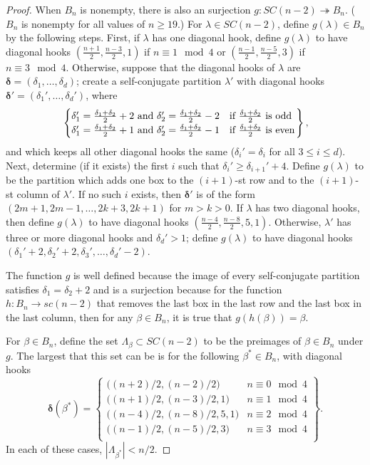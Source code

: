 \documentclass[12pt,leqno]{amsart}
\numberwithin{equation}{section}
\theoremstyle{definition}
\begin{document}
\begin{proof}
When $B_n$ is nonempty, there is also an surjection $g:SC(n-2) \twoheadrightarrow B_n$.  ($B_n$ is nonempty for all values of $n\geq 19$.)  For ${\lambda}\in SC(n-2)$, define $g({\lambda})\in B_n$ by the following steps.  First, if ${\lambda}$ has one diagonal hook, define $g({\lambda})$ to have diagonal hooks $(\frac{n+1}{2},\frac{n-3}{2},1)$ if $n\equiv 1\mod 4$ or $(\frac{n-1}{2},\frac{n-5}{2},3)$ if $n\equiv 3\mod 4$. Otherwise, suppose that the diagonal hooks of ${\lambda}$ are $\boldsymbol\delta=(\delta_1,\hdots,\delta_d)$; create a self-conjugate partition ${\lambda}'$ with diagonal hooks $\boldsymbol\delta'=(\delta_1',\hdots,\delta_d')$, where
\begin{equation*}
\left.
\begin{cases}
\delta_1'=\frac{\delta_1+\delta_2}{2}+2 \textup{ and } \delta_2'=\frac{\delta_1+\delta_2}{2}-2 & \textup{if $\frac{\delta_1+\delta_2}{2}$ is odd} \\
\delta_1'=\frac{\delta_1+\delta_2}{2}+1 \textup{ and } \delta_2'=\frac{\delta_1+\delta_2}{2}-1 & \textup{if $\frac{\delta_1+\delta_2}{2}$ is even}
\end{cases}
\right\},
\end{equation*}
and which keeps all other diagonal hooks the same ($\delta_i'=\delta_i$ for all $3\leq i\leq d$).  Next, determine (if it exists) the first $i$ such that $\delta_i'\geq \delta_{i+1}'+4$.  Define $g({\lambda})$ to be the partition which adds one box to the $(i+1)$-st row and to the $(i+1)$-st column of ${\lambda}'$.  If no such $i$ exists, then $\boldsymbol\delta'$ is of the form $(2m+1,2m-1,\hdots,2k+3,2k+1)$ for $m> k>0$.  If ${\lambda}$ has two diagonal hooks, then define $g({\lambda})$ to have diagonal hooks $(\frac{n-4}{2},\frac{n-8}{2},5,1)$.  
Otherwise, ${\lambda}'$ has three or more diagonal hooks and $\delta_d'>1$; define $g({\lambda})$ to have diagonal hooks $(\delta_1'+2,\delta_2'+2,\delta_3',\hdots,\delta_d'-2)$. 

The function $g$ is well defined because the image of every self-conjugate partition satisfies $\delta_1=\delta_2+2$  and is a surjection because for the function $h:B_n\rightarrow sc(n-2)$ that removes the last box in the last row and the last box in the last column, then for any $\beta\in B_n$, it is true that $g(h(\beta))=\beta$.  

For $\beta\in B_n$, define the set $\Lambda_\beta\subset SC(n-2)$ to be the preimages of $\beta\in B_n$ under $g$.  The largest that this set can be is for the following $\beta^*\in B_n$, with diagonal hooks 
\[\left.\boldsymbol\delta(\beta^*)=
\begin{cases}
\big((n+2)/2,(n-2)/2\big) & n\equiv 0\mod 4 \\
\big((n+1)/2,(n-3)/2,1\big) & n\equiv 1\mod 4 \\
\big((n-4)/2,(n-8)/2,5,1\big) & n\equiv 2\mod 4 \\
\big((n-1)/2,(n-5)/2,3\big) & n\equiv 3\mod 4 \\
\end{cases}
\right\}.\]
In each of these cases, $|\Lambda_{\beta^*}|<n/2$.


\end{proof}
\end{document}
